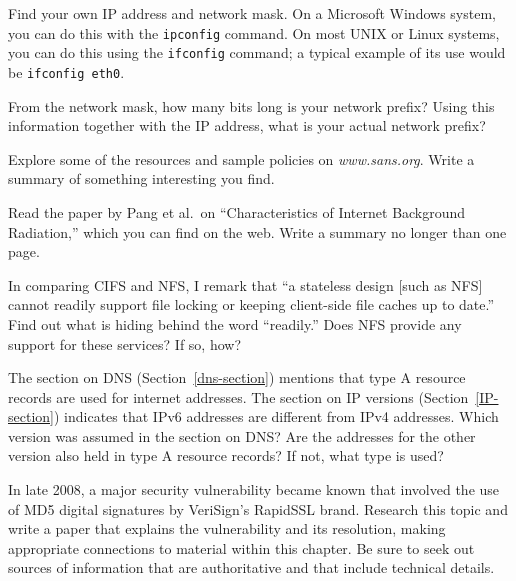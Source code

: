 \begin{chapterEnumerate}
\item
Find your own IP
address and network mask.  
On a Microsoft Windows system, you can do this with the
\verb|ipconfig| command.  On most UNIX or Linux systems, you can do
this using the \verb|ifconfig| command; a typical example of its use
would be \verb|ifconfig eth0|.

From the network mask, how many bits long
is your network prefix?  Using this information together with the IP
address, what is your actual network prefix?

\item
Explore some of the resources and sample policies on
\textit{www.sans.org}.  Write a summary of something interesting you
find.

\item
Read the paper by Pang et al.\ on ``Characteristics of
Internet Background Radiation,'' which you can find on the web.  Write
a summary no longer than one page.

\item
In comparing CIFS and NFS, I remark that ``a stateless design [such as NFS] cannot readily support file locking or keeping client-side file caches up to date.''  Find out what is hiding behind the word ``readily.''  Does NFS provide any support for these services?  If so, how?

\item
The section on DNS (Section~\ref{dns-section}) mentions that type A resource records are used for internet addresses.  The section on IP versions (Section~\ref{IP-section}) indicates that IPv6 addresses are different from IPv4 addresses.  Which version was assumed in the section on DNS?  Are the addresses for the other version also held in type A resource records?  If not, what type is used?

\item
In late 2008, a major security vulnerability became known that involved the use of MD5 digital signatures by VeriSign's RapidSSL brand. Research this topic and write a paper that explains the vulnerability and its resolution, making appropriate connections to material within this chapter.  Be sure to seek out sources of information that are authoritative and that include technical details.
\end{chapterEnumerate}

